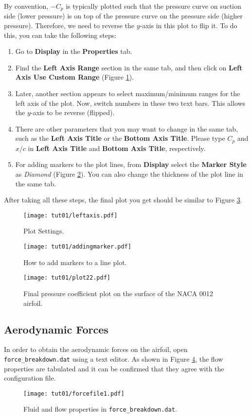 By convention, $-C_p$ is typically plotted such that the pressure curve on suction side (lower pressure) is on top of the pressure curve on the pressure side (higher pressure). Therefore, we need to reverse the $y$-axis in this plot to flip it. To do this, you can take the following steps:
\begin{enumerate}[label=\arabic*)]
	\setcounter{enumi}{0}
	\item Go to \textbf{Display} in the \textbf{Properties} tab.
	\item Find the \textbf{Left Axis Range} section in the same tab, and then click on \textbf{Left Axis Use Custom Range} (Figure \ref{fig1:viewsetting}). 
	\item Later, another section appears to select maximum/minimum ranges for the left axis of the plot. Now, switch numbers in these two text bars. This allows the $y$-axis to be reverse (flipped).
	\item There are other parameters that you may want to change in the same tab, such as the \textbf{Left Axis Title} or the \textbf{Bottom Axis Title}. Please type $C_p$ and $x/c$ in \textbf{Left Axis Title} and \textbf{Bottom Axis Title}, respectively.
	\item For adding markers to the plot lines, from \textbf{Display} select the \textbf{Marker Style} as \textit{Diamond} (Figure \ref{fig1:marker}). You can also change the thickness of the plot line in the same tab.
\end{enumerate}
After taking all these steps, the final plot you get should be similar to Figure \ref{fig1:surface_pressure2}.
\begin{figure}[ht]
    \centering
    \texttt{[image: tut01/leftaxis.pdf]}
    \caption{Plot Settings.}
    \label{fig1:viewsetting}
\end{figure}
\begin{figure}[H]
    \centering
    \texttt{[image: tut01/addingmarker.pdf]}
    \caption{How to add markers to a line plot.}
    \label{fig1:marker}
\end{figure}

\begin{figure}[ht]
    \centering
    \texttt{[image: tut01/plot22.pdf]}
    \caption{Final pressure coefficient plot on the surface of the NACA 0012 airfoil.}
    \label{fig1:surface_pressure2}
\end{figure}
\subsection{Aerodynamic Forces}
In order to obtain the aerodynamic forces on the airfoil, open \texttt{force\_breakdown.dat} using a text editor. As shown in Figure \ref{fig1:forcefile1}, the flow properties are tabulated and it can be confirmed that they agree with the configuration file. 
\begin{figure}[ht]
    \centering
    \texttt{[image: tut01/forcefile1.pdf]}
    \caption{Fluid and flow properties in \texttt{force\_breakdown.dat}.}
    \label{fig1:forcefile1}
\end{figure}

